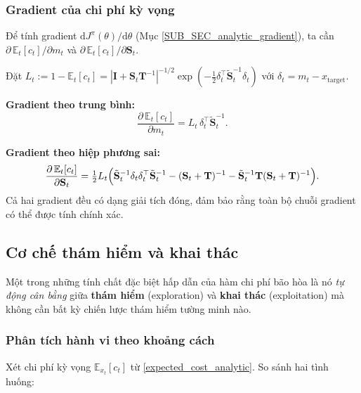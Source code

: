 \subsubsection{Gradient của chi phí kỳ vọng}
\label{SUB_SUB_SEC_cost_gradient}

Để tính gradient $\mathrm{d}J^\pi(\theta)/\mathrm{d}\theta$ (Mục \ref{SUB_SEC_analytic_gradient}), ta cần $\partial\,\mathbb{E}_t[c_t]/\partial m_t$ và $\partial\,\mathbb{E}_t[c_t]/\partial \mathbf{S}_t$.

Đặt $L_t := 1 - \mathbb{E}_t[c_t] = |\mathbf{I} + \mathbf{S}_t \mathbf{T}^{-1}|^{-1/2} \exp(-\tfrac{1}{2} \delta_t^\top \tilde{\mathbf{S}}_t^{-1} \delta_t)$ với $\delta_t = m_t - x_{\mathrm{target}}$.

\textbf{Gradient theo trung bình:}
\begin{equation}
    \frac{\partial\,\mathbb{E}_t[c_t]}{\partial m_t} = L_t\, \delta_t^\top \tilde{\mathbf{S}}_t^{-1}.
    \label{cost_grad_mean}
\end{equation}

\textbf{Gradient theo hiệp phương sai:}
\begin{equation}
    \frac{\partial\,\mathbb{E}_t[c_t]}{\partial \mathbf{S}_t} = \tfrac{1}{2} L_t \Bigl(\tilde{\mathbf{S}}_t^{-1} \delta_t \delta_t^\top \tilde{\mathbf{S}}_t^{-1} - (\mathbf{S}_t + \mathbf{T})^{-1} - \tilde{\mathbf{S}}_t^{-1} \mathbf{T} (\mathbf{S}_t + \mathbf{T})^{-1}\Bigr).
    \label{cost_grad_cov}
\end{equation}
Cả hai gradient đều có dạng giải tích đóng, đảm bảo rằng toàn bộ chuỗi gradient có thể được tính chính xác.

\subsection{Cơ chế thám hiểm và khai thác}
\label{SUB_SEC_exploration}

Một trong những tính chất đặc biệt hấp dẫn của hàm chi phí bão hòa là nó \textit{tự động cân bằng} giữa \textbf{thám hiểm} (exploration) và \textbf{khai thác} (exploitation) mà không cần bất kỳ chiến lược thám hiểm tường minh nào.

\subsubsection{Phân tích hành vi theo khoảng cách}
\label{SUB_SUB_SEC_exploration_analysis}

Xét chi phí kỳ vọng $\mathbb{E}_{x_t}[c_t]$ từ \eqref{expected_cost_analytic}. So sánh hai tình huống:

